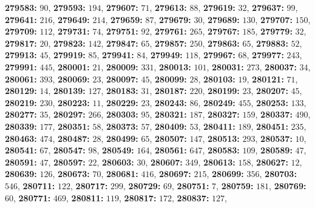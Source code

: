 \textsf{\bfseries 279583:} $90$, \textsf{\bfseries 279593:} $194$, \textsf{\bfseries 279607:} $71$, \textsf{\bfseries 279613:} $88$, \textsf{\bfseries 279619:} $32$, \textsf{\bfseries 279637:} $99$, \textsf{\bfseries 279641:} $216$, \textsf{\bfseries 279649:} $214$, \textsf{\bfseries 279659:} $87$, \textsf{\bfseries 279679:} $30$, \textsf{\bfseries 279689:} $130$, \textsf{\bfseries 279707:} $150$, \textsf{\bfseries 279709:} $112$, \textsf{\bfseries 279731:} $74$, \textsf{\bfseries 279751:} $92$, \textsf{\bfseries 279761:} $265$, \textsf{\bfseries 279767:} $185$, \textsf{\bfseries 279779:} $32$, \textsf{\bfseries 279817:} $20$, \textsf{\bfseries 279823:} $142$, \textsf{\bfseries 279847:} $65$, \textsf{\bfseries 279857:} $250$, \textsf{\bfseries 279863:} $65$, \textsf{\bfseries 279883:} $52$, \textsf{\bfseries 279913:} $45$, \textsf{\bfseries 279919:} $85$, \textsf{\bfseries 279941:} $84$, \textsf{\bfseries 279949:} $118$, \textsf{\bfseries 279967:} $68$, \textsf{\bfseries 279977:} $243$, \textsf{\bfseries 279991:} $445$, \textsf{\bfseries 280001:} $21$, \textsf{\bfseries 280009:} $331$, \textsf{\bfseries 280013:} $101$, \textsf{\bfseries 280031:} $273$, \textsf{\bfseries 280037:} $34$, \textsf{\bfseries 280061:} $393$, \textsf{\bfseries 280069:} $23$, \textsf{\bfseries 280097:} $45$, \textsf{\bfseries 280099:} $28$, \textsf{\bfseries 280103:} $19$, \textsf{\bfseries 280121:} $71$, \textsf{\bfseries 280129:} $14$, \textsf{\bfseries 280139:} $127$, \textsf{\bfseries 280183:} $31$, \textsf{\bfseries 280187:} $220$, \textsf{\bfseries 280199:} $23$, \textsf{\bfseries 280207:} $45$, \textsf{\bfseries 280219:} $230$, \textsf{\bfseries 280223:} $11$, \textsf{\bfseries 280229:} $23$, \textsf{\bfseries 280243:} $86$, \textsf{\bfseries 280249:} $455$, \textsf{\bfseries 280253:} $133$, \textsf{\bfseries 280277:} $35$, \textsf{\bfseries 280297:} $266$, \textsf{\bfseries 280303:} $95$, \textsf{\bfseries 280321:} $187$, \textsf{\bfseries 280327:} $159$, \textsf{\bfseries 280337:} $490$, \textsf{\bfseries 280339:} $177$, \textsf{\bfseries 280351:} $58$, \textsf{\bfseries 280373:} $57$, \textsf{\bfseries 280409:} $53$, \textsf{\bfseries 280411:} $189$, \textsf{\bfseries 280451:} $235$, \textsf{\bfseries 280463:} $474$, \textsf{\bfseries 280487:} $28$, \textsf{\bfseries 280499:} $65$, \textsf{\bfseries 280507:} $147$, \textsf{\bfseries 280513:} $293$, \textsf{\bfseries 280537:} $10$, \textsf{\bfseries 280541:} $67$, \textsf{\bfseries 280547:} $98$, \textsf{\bfseries 280549:} $164$, \textsf{\bfseries 280561:} $647$, \textsf{\bfseries 280583:} $109$, \textsf{\bfseries 280589:} $47$, \textsf{\bfseries 280591:} $47$, \textsf{\bfseries 280597:} $22$, \textsf{\bfseries 280603:} $30$, \textsf{\bfseries 280607:} $349$, \textsf{\bfseries 280613:} $158$, \textsf{\bfseries 280627:} $12$, \textsf{\bfseries 280639:} $126$, \textsf{\bfseries 280673:} $70$, \textsf{\bfseries 280681:} $416$, \textsf{\bfseries 280697:} $215$, \textsf{\bfseries 280699:} $356$, \textsf{\bfseries 280703:} $546$, \textsf{\bfseries 280711:} $122$, \textsf{\bfseries 280717:} $299$, \textsf{\bfseries 280729:} $69$, \textsf{\bfseries 280751:} $7$, \textsf{\bfseries 280759:} $181$, \textsf{\bfseries 280769:} $60$, \textsf{\bfseries 280771:} $469$, \textsf{\bfseries 280811:} $119$, \textsf{\bfseries 280817:} $172$, \textsf{\bfseries 280837:} $127$, 
